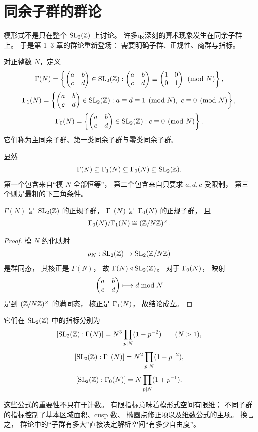 \section{同余子群的群论}
模形式不是只在整个 $\mathrm{SL}_2(\mathbb{Z})$ 上讨论。 许多最深刻的算术现象发生在同余子群上。 于是第 1--3 章的群论重新登场： 需要明确子群、正规性、商群与指标。
\begin{definition}
对正整数 $N$，定义
\[ \Gamma(N)=\left\{\begin{pmatrix} a&b\\c&d \end{pmatrix}\in\mathrm{SL}_2(\mathbb{Z}): \begin{pmatrix} a&b\\c&d \end{pmatrix}\equiv \begin{pmatrix} 1&0\\0&1 \end{pmatrix}\pmod N\right\}, \]
\[ \Gamma_1(N)=\left\{\begin{pmatrix} a&b\\c&d \end{pmatrix}\in\mathrm{SL}_2(\mathbb{Z}): a\equiv d\equiv 1\pmod N,\ c\equiv 0\pmod N\right\}, \]
\[ \Gamma_0(N)=\left\{\begin{pmatrix} a&b\\c&d \end{pmatrix}\in\mathrm{SL}_2(\mathbb{Z}): c\equiv 0\pmod N\right\}. \]
它们称为主同余子群、第一类同余子群与零类同余子群。
\end{definition}
显然
\[ \Gamma(N)\subseteq \Gamma_1(N)\subseteq \Gamma_0(N)\subseteq \mathrm{SL}_2(\mathbb{Z}). \]
第一个包含来自“模 $N$ 全部恒等”，
第二个包含来自只要求 $a,d,c$ 受限制，
第三个则是最粗的下三角条件。
\begin{proposition}
$\Gamma(N)$ 是 $\mathrm{SL}_2(\mathbb{Z})$ 的正规子群，
$\Gamma_1(N)$ 是 $\Gamma_0(N)$ 的正规子群，
且
\[ \Gamma_0(N)/\Gamma_1(N)\cong (\mathbb{Z}/N\mathbb{Z})^\times. \]
\end{proposition}
\begin{proof}
模 $N$ 约化映射
\[ \rho_N:\mathrm{SL}_2(\mathbb{Z})\to \mathrm{SL}_2(\mathbb{Z}/N\mathbb{Z}) \]
是群同态，
其核正是 $\Gamma(N)$，
故 $\Gamma(N)\triangleleft \mathrm{SL}_2(\mathbb{Z})$。
对于 $\Gamma_0(N)$，
映射
\[ \begin{pmatrix} a&b\\c&d \end{pmatrix}\longmapsto d\bmod N \]
是到 $(\mathbb{Z}/N\mathbb{Z})^\times$ 的满同态，
核正是 $\Gamma_1(N)$，
故结论成立。
\end{proof}
\begin{theorem}
它们在 $\mathrm{SL}_2(\mathbb{Z})$ 中的指标分别为
\[ [\mathrm{SL}_2(\mathbb{Z}):\Gamma(N)]=N^3\prod_{p\mid N}(1-p^{-2}) \qquad (N>1), \]
\[ [\mathrm{SL}_2(\mathbb{Z}):\Gamma_1(N)]=N^2\prod_{p\mid N}(1-p^{-2}), \]
\[ [\mathrm{SL}_2(\mathbb{Z}):\Gamma_0(N)]=N\prod_{p\mid N}(1+p^{-1}). \]
\end{theorem}
这些公式的重要性不只在于计数。 有限指标意味着模形式空间有限维； 不同子群的指标控制了基本区域面积、cusp 数、 椭圆点修正项以及维数公式的主项。 换言之， 群论中的“子群有多大”直接决定解析空间“有多少自由度”。
